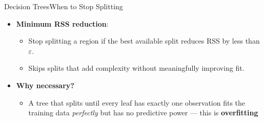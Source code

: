 \documentclass[dvipsnames,hyperref={pdfpagelabels=false}]{beamer}
\begin{document}
\begin{frame}{Decision Trees}{When to Stop Splitting}

\begin{itemize}
  \item \textbf{Minimum RSS reduction}:
  \begin{itemize}
   \vspace{0.2cm}
   \item Stop splitting a region if the best available split reduces RSS by less than $\varepsilon$. 
     \vspace{0.2cm}
   \item  Skips splits that add complexity without meaningfully improving fit.
     \vspace{0.2cm}
\end{itemize}
\vspace{0.2cm}

  \item \textbf{Why necessary?} 
\vspace{0.2cm}

    \begin{itemize}  
  \item A tree that splits until every leaf has exactly one observation fits the training data \emph{perfectly} but has no predictive power --- this is \textbf{overfitting}

  \end{itemize}

\end{itemize}


\end{frame}
\end{document}
